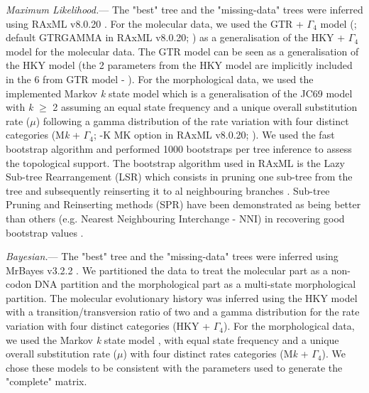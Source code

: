 \documentclass[12pt,letterpaper]{article}
\renewcommand{\subsubsection}[1]{%
\vspace{2ex}
\noindent
\textit{#1.}---}
\begin{document}
\subsubsection{Maximum Likelihood}
The "best" tree and the "missing-data" trees were inferred using RAxML v8.0.20 \citep{Stamatakis21012014}.
For the molecular data, we used the GTR + $\Gamma_4$ model (\citet{tavare1986}; default GTRGAMMA in RAxML v8.0.20; \citet{Stamatakis21012014}) as a generalisation of the HKY + $\Gamma_4$ model \citep{HKY85} for the molecular data.
The GTR model can be seen as a generalisation of the HKY model (the 2 parameters from the HKY model are implicitly included in the 6 from GTR model - \citet{stamatakisa2008}).
For the morphological data, we used the implemented Markov \textit{k} state model \citep{lewisa2001} which is a generalisation of the JC69 model \citep{jc69} with \textit{k} $\geq$ 2 assuming an equal state frequency and a unique overall substitution rate ($\mu$) following a gamma distribution of the rate variation with four distinct categories (M\textit{k} + $\Gamma_4$; -K MK option in RAxML v8.0.20; \citet{Stamatakis21012014}).
We used the fast bootstrap algorithm and performed 1000 bootstraps per tree inference to assess the topological support. %
The bootstrap algorithm used in RAxML is the Lazy Sub-tree Rearrangement (LSR) which consists in pruning one sub-tree from the tree and subsequently reinserting it to al neighbouring branches \citep{stamatakisa2008}.
Sub-tree Pruning and Reinserting methods (SPR) have been demonstrated as being better than others (e.g. Nearest Neighbouring Interchange - NNI) in recovering good bootstrap values \citep{salamin2003}.

\subsubsection{Bayesian}
The "best" tree and the "missing-data" trees were inferred using MrBayes v3.2.2 \citep{Ronquist2012mrbayes}.
We partitioned the data to treat the molecular part as a non-codon DNA partition and the morphological part as a multi-state morphological partition.
The molecular evolutionary history was inferred using the HKY model with a transition/transversion ratio of two \citep{douadycomparison2003} and a gamma distribution for the rate variation with four distinct categories (HKY + $\Gamma_4$).
For the morphological data, we used the Markov \textit{k} state model \citep{lewisa2001}, with equal state frequency and a unique overall substitution rate ($\mu$) with four distinct rates categories (M\textit{k} + $\Gamma_4$).
We chose these models to be consistent with the parameters used to generate the "complete" matrix.
\end{document}
